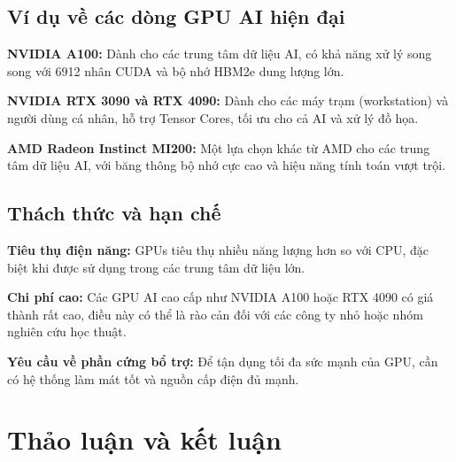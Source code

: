 \documentclass[a4paper]{article}
\begin{document}
\subsection{Ví dụ về các dòng GPU AI hiện đại}
\textbf{NVIDIA A100:} Dành cho các trung tâm dữ liệu AI, có khả năng xử lý song song với
6912 nhân CUDA và bộ nhớ HBM2e dung lượng lớn.

\textbf{NVIDIA RTX 3090 và RTX 4090:} Dành cho các máy trạm (workstation) và người dùng
cá nhân, hỗ trợ Tensor Cores, tối ưu cho cả AI và xử lý đồ họa.

\textbf{AMD Radeon Instinct MI200:} Một lựa chọn khác từ AMD cho các trung tâm dữ liệu
AI, với băng thông bộ nhớ cực cao và hiệu năng tính toán vượt trội.

\subsection{Thách thức và hạn chế}
\textbf{Tiêu thụ điện năng:} GPUs tiêu thụ nhiều năng lượng hơn so với CPU, đặc biệt khi được
sử dụng trong các trung tâm dữ liệu lớn.

\textbf{Chi phí cao:} Các GPU AI cao cấp như NVIDIA A100 hoặc RTX 4090 có giá thành rất
cao, điều này có thể là rào cản đối với các công ty nhỏ hoặc nhóm nghiên cứu học thuật.

\textbf{Yêu cầu về phần cứng bổ trợ:} Để tận dụng tối đa sức mạnh của GPU, cần có hệ thống
làm mát tốt và nguồn cấp điện đủ mạnh.

\section{Thảo luận và kết luận}
\end{document}
